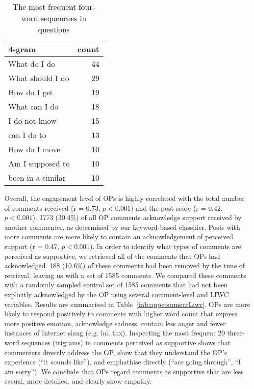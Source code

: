 \begin{table}[h!]
  \begin{center}
    \caption{The most frequent four-word sequencees in questions}
    \label{tab:n-gram}
    \begin{tabular}{lr} 
    \hline
      \textbf{4-gram} & \textbf{count} \\
      \hline
		What do I do & 44\\
		What should I do & 29\\
		How do I get & 19\\
		What can I do & 18\\
		I do not know & 15\\
		can I do to & 13\\
		How do I move & 10\\
		Am I supposed to & 10\\
		been in a similar & 10\\
	\hline
    \end{tabular} 
  \end{center}
\end{table}

Overall, the engagement level of OPs is highly correlated with the total number of comments received (r = 0.73, $p <0.001$) and the post score (r = 0.42, $p < 0.001$). 1773 (30.4\%) of all OP comments acknowledge support received by another commenter, as determined by our keyword-based classifier. Posts with more comments are more likely to contain an acknowledgement of perceived support (r = 0.47, $p <0.001$). In order to identify what types of comments are perceived as supportive, we retrieved all of the comments that OPs had acknowledged. 188 (10.6\%) of these comments had been removed by the time of retrieval, leaving us with a set of 1585 comments. We compared these comments with a randomly sampled control set of 1585 comments that had not been explicitly acknowledged by the OP using several comment-level and LIWC variables. Results are summarised in Table~\ref{tab:appcommentLiwc}. 
OPs are more likely to respond positively to comments with higher word count that express more positive emotion, acknowledge sadness, contain less anger and fewer instances of Internet slang (e.g. lol, thx). Inspecting the most frequent 20 three-word sequences (trigrams) in comments perceived as supportive shows that commenters directly address the OP, show that they understand the OP's experience (``it sounds like''), and emphathise directly (``are going through'', ``I am sorry''). 
We conclude that OPs regard comments as supportive that are less casual, more detailed, and clearly show empathy.

